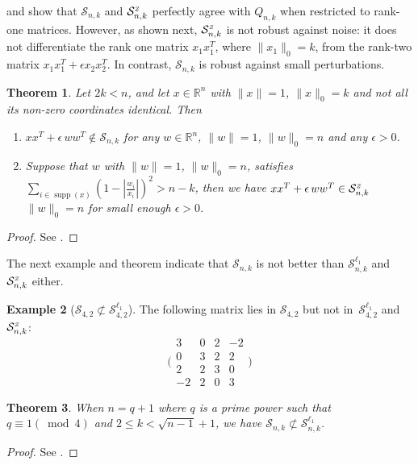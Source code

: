 \documentclass[11pt]{amsart}
\newcommand{\Szero}[2]{\ensuremath{\mathcal{S}_{#1,#2}}}
\newcommand{\Sone}[2]{\ensuremath{\mathcal{S}_{#1,#2}^{\ell_1}}}
\newcommand{\Sz}[2]{\ensuremath{\mathcal{S}_{#1,#2}^{\textit{\tiny{Z}}}}}
\theoremstyle{plain}
\newtheorem{thm}{Theorem}[section]
\theoremstyle{definition}
\newtheorem{ex}[thm]
{Example}
\theoremstyle{remark}
\newcommand{\RR}{\mathbb{R}}
\DeclareMathOperator{\supp}{supp}
\begin{document}
     and  show that $\Szero{n}{k}$ and $\Sz{n}{k}$ perfectly agree with $Q_{n,k}$ when restricted to rank-one matrices.
    However, as shown next, $\Sz{n}{k}$ is not robust against noise:
    it does not differentiate the rank one matrix $x_1 x_1^T$, where \(\|x_1\|_0=k\), 
    from the rank-two matrix \(x_1x_1^T + \epsilon  x_2x_2^T\).
    In contrast, $\Szero{n}{k}$ is robust against small perturbations.
    
	\begin{thm}\label{thm:Sz_perturbation}
		Let \(2k<n\), and let $x \in \RR^n$ with $\|x\|=1$, \(\|x\|_0=k\) and not all its non-zero coordinates identical.
        Then
		\begin{enumerate}
			\item \label{eq:compare_ourset}
            \(x x^T + \epsilon \, w w^T \notin \Szero{n}{k}\)
            for any $w \!\in\! \RR^n$, $\|w\|=1$, $\|w\|_0\!=\!n$ and any $\epsilon \!>\! 0$.
			\item\label{eq:compare_Sz}
            Suppose that \(w\) with $\|w\|=1$, \(\|w\|_0=n\), satisfies \(\sum_{i\in\supp(x)}(1 - |\tfrac{w_i}{x_i}|)^2 > n - k\), then we have
            \(x x^T + \epsilon \, w w^T \in \Sz{n}{k}\)
            $\|w\|_0 \!=\! n$ for small enough $\epsilon \!>\! 0$.
		\end{enumerate}
	\end{thm}

	\begin{proof}
		See .
	\end{proof}
	
	The next example and theorem indicate that $\Szero{n}{k}$ is not better than $\Sone{n}{k}$ and $\Sz{n}{k}$ either.
	
	\begin{ex}[$\Szero{4}{2}\not\subset \Sone{4}{2}$]
		The following matrix lies in $\Szero{4}{2}$ but not in~$\Sone{4}{2}$ and $\Sz{n}{k}$:
		\[
		\Bigg(\begin{smallmatrix}
			3 & 0 & 2 & -2\\
			0 & 3 & 2 & 2\\
			2 & 2 & 3 & 0\\
			-2 & 2 & 0  & 3
		\end{smallmatrix}\Bigg)
		\]
	\end{ex}
	
	\begin{thm}\label{thm:Szero_notsubset_Sone}
		When \( n = q + 1\) where \(q\) is a prime power such that \(q \equiv 1 (\bmod 4)\) and \(2\leq k < \sqrt{n-1}+1\), we have \(\Szero{n}{k} \not\subset \Sone{n}{k}\).
	\end{thm}
	\begin{proof}
		See .
	\end{proof}
	
\end{document}

